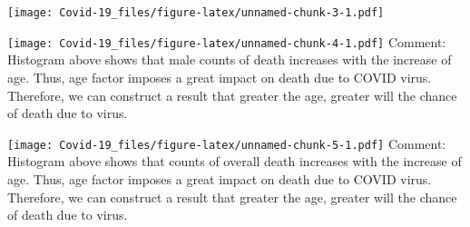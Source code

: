 \documentclass[
]{article}
\newenvironment{Shaded}{\begin{snugshade}}{\end{snugshade}}
\newcommand{\AttributeTok}[1]{\textcolor[rgb]{0.77,0.63,0.00}{#1}}
\newcommand{\CommentTok}[1]{\textcolor[rgb]{0.56,0.35,0.01}{\textit{#1}}}
\newcommand{\DecValTok}[1]{\textcolor[rgb]{0.00,0.00,0.81}{#1}}
\newcommand{\FunctionTok}[1]{\textcolor[rgb]{0.00,0.00,0.00}{#1}}
\newcommand{\NormalTok}[1]{#1}
\newcommand{\OtherTok}[1]{\textcolor[rgb]{0.56,0.35,0.01}{#1}}
\newcommand{\SpecialCharTok}[1]{\textcolor[rgb]{0.00,0.00,0.00}{#1}}
\newcommand{\StringTok}[1]{\textcolor[rgb]{0.31,0.60,0.02}{#1}}
\begin{document}
\texttt{[image: Covid-19\_files/figure-latex/unnamed-chunk-3-1.pdf]}

\begin{Shaded}
\end{Shaded}

\texttt{[image: Covid-19\_files/figure-latex/unnamed-chunk-4-1.pdf]}
Comment: Histogram above shows that male counts of death increases with
the increase of age. Thus, age factor imposes a great impact on death
due to COVID virus. Therefore, we can construct a result that greater
the age, greater will the chance of death due to virus.

\begin{Shaded}
\end{Shaded}

\texttt{[image: Covid-19\_files/figure-latex/unnamed-chunk-5-1.pdf]}
Comment: Histogram above shows that counts of overall death increases
with the increase of age. Thus, age factor imposes a great impact on
death due to COVID virus. Therefore, we can construct a result that
greater the age, greater will the chance of death due to virus.
\end{document}
